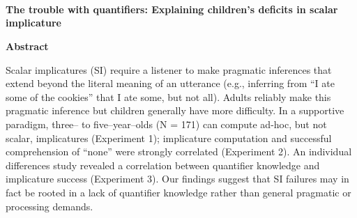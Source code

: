 \documentclass[man]{apa2}
\begin{document}
~\\
~\\
~\\
\begin{center}
\textbf{The trouble with quantifiers: Explaining children's deficits in scalar implicature}
\end{center}
\newpage 
\begin{center}
\textbf{Abstract}
\vspace{5 mm}
\end{center}
\noindent
Scalar implicatures (SI) require a listener to make pragmatic inferences that extend beyond the literal meaning of an utterance (e.g., inferring from ``I ate some of the cookies'' that I ate some, but not all). Adults reliably make this pragmatic inference but children generally have more difficulty. In a supportive paradigm, three-- to five--year--olds (N = 171) can compute ad-hoc, but not scalar, implicatures (Experiment 1); implicature computation and successful comprehension of ``none'' were strongly correlated (Experiment 2). An individual differences study revealed a correlation between quantifier knowledge and implicature success (Experiment 3). Our findings suggest that SI failures may in fact be rooted in a lack of quantifier knowledge rather than general pragmatic or processing demands.

\end{document}
